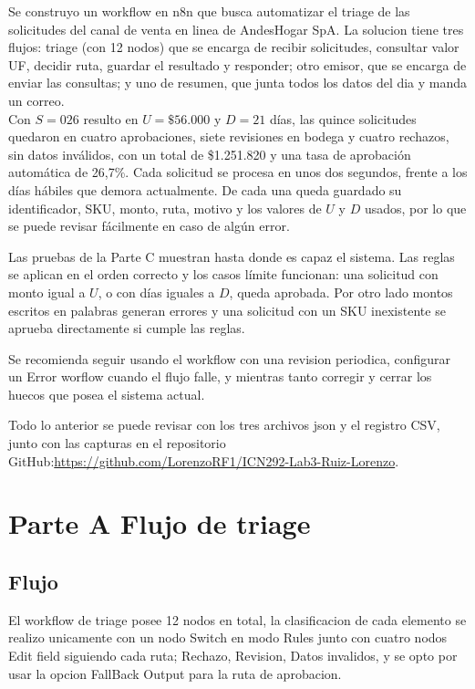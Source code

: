 Se construyo un workflow en n8n que busca automatizar el triage de las solicitudes del canal de venta en linea de AndesHogar SpA. La solucion tiene tres flujos: triage (con 12 nodos) que se encarga de recibir solicitudes, consultar valor UF, decidir ruta, guardar el resultado y responder; otro emisor, que se encarga de enviar las consultas; y uno de resumen, que junta todos los datos del dia y manda un correo.\\ 
Con $S = 026$ resulto en $U = \$56.000$ y $D = 21$ días, las quince solicitudes quedaron en cuatro
aprobaciones, siete revisiones en bodega y cuatro rechazos, sin datos inválidos, con un total de 
\$1.251.820 y una tasa de aprobación automática de 26,7\%. Cada solicitud se procesa en unos dos
segundos, frente a los días hábiles que demora actualmente. De cada una queda
guardado su identificador, SKU, monto, ruta, motivo y los valores de $U$ y $D$ usados, por lo que se puede revisar fácilmente en caso de algún error.

Las pruebas de la Parte C muestran hasta donde es capaz el sistema. Las reglas se aplican en el
orden correcto y los casos límite funcionan: una solicitud con monto igual a $U$, o con días
iguales a $D$, queda aprobada. Por otro lado montos escritos en palabras generan errores y una solicitud con un SKU inexistente se aprueba directamente si cumple las reglas. 

Se recomienda seguir usando el workflow con una revision periodica, configurar un Error worflow cuando el flujo falle, y mientras tanto corregir y cerrar los huecos que posea el sistema actual.

Todo lo anterior se puede revisar con los tres archivos json y el registro CSV, junto con las capturas en el repositorio GitHub:\url{https://github.com/LorenzoRF1/ICN292-Lab3-Ruiz-Lorenzo}.

\newpage
%
\tableofcontents
\clearpage

\newpage
\section{Parte A Flujo de triage}
\subsection{Flujo}
El workflow de triage posee 12 nodos en total, la clasificacion de cada elemento se realizo unicamente con un nodo Switch en modo Rules junto con cuatro nodos Edit field siguiendo cada ruta; Rechazo, Revision, Datos invalidos, y se opto por usar la opcion FallBack Output para la ruta de aprobacion. 

